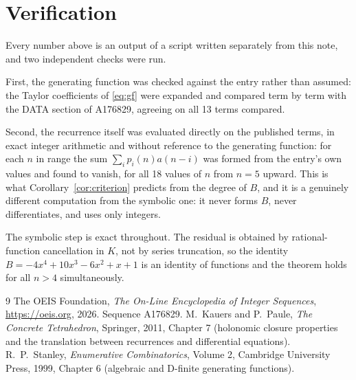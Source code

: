 \documentclass[11pt,a4paper]{article}
\theoremstyle{plain}
\theoremstyle{definition}
\begin{document}
\section{Verification}

Every number above is an output of a script written separately from this note, and two
independent checks were run.

First, the generating function was checked against the entry rather than assumed: the
Taylor coefficients of \eqref{eq:gf} were expanded and compared term by term with the DATA
section of A176829, agreeing on all 13 terms compared.

Second, the recurrence itself was evaluated directly on the published terms, in exact
integer arithmetic and without reference to the generating function: for each $n$ in range
the sum $\sum_{i}p_{i}(n)a(n-i)$ was formed from the entry's own values and found to
vanish, for all 18 values of $n$ from $n=5$ upward. This is what
Corollary~\ref{cor:criterion} predicts from the degree of $B$, and it is a genuinely
different computation from the symbolic one: it never forms $B$, never differentiates, and
uses only integers.

The symbolic step is exact throughout. The residual is obtained by rational-function
cancellation in $K$, not by series truncation, so the identity $B=- 4 x^{4} + 10 x^{3} - 6 x^{2} + x + 1$ is an
identity of functions and the theorem holds for all $n>4$ simultaneously.

\begin{thebibliography}{9}
 The OEIS Foundation, \emph{The On-Line Encyclopedia of Integer Sequences},
\url{https://oeis.org}, 2026. Sequence A176829.
 M.~Kauers and P.~Paule, \emph{The Concrete Tetrahedron}, Springer, 2011,
Chapter 7 (holonomic closure properties and the translation between recurrences and
differential equations).
 R.~P.~Stanley, \emph{Enumerative Combinatorics}, Volume 2, Cambridge
University Press, 1999, Chapter 6 (algebraic and D-finite generating functions).
\end{thebibliography}
\end{document}
